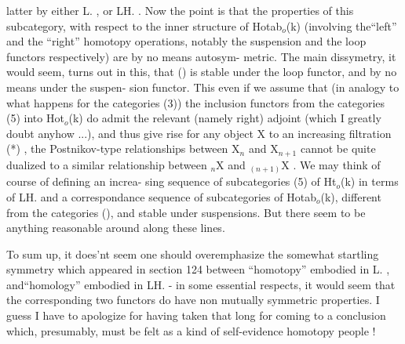
latter by either L\hand{$\pi$}. , or LH. . Now the point is that the properties
of this subcategory, with respect to the inner structure of Hotab$_o$(k)
(involving the``left'' and the ``right'' homotopy operations, notably the
suspension and the loop functors respectively) are by no means autosym-%
metric. The main dissymetry, it would seem, turns out in this, that
() is stable under the loop functor, and by no means under the suspen-%
sion functor. This  even if we assume that (in analogy
to what happens for the categories (3)) the inclusion functors from the
categories (5) into Hot$_o$(k) do admit the relevant (namely right) adjoint
(which I greatly doubt anyhow ...), and thus give rise for any object X
to an increasing filtration (*) , the Postnikov-type relationships
between X$_n$ and X$_{n+1}$ cannot be quite dualized to a similar relationship
between $_n$X and $_{(n+1)}$X . We may think  of course\hand{,} of defining an increa-%
sing sequence of subcategories  (5) of Ht$_o$(k) in terms of LH. and a
correspondance sequence of subcategories of Hotab$_o$(k), different from
the categories (), and stable under suspensions. 
 But there  seem to be anything reasonable 
around along these lines.

To sum up, it does'nt seem one should overemphasize the somewhat
startling symmetry which appeared in section 124 between ``homotopy''
 embodied in L\hand{$\pi$}. , and``homology'' embodied in LH. -
in some essential respects, it would seem that the corresponding two
functors do have non mutually symmetric properties. I guess I have to
apologize for having taken that long for coming to a conclusion which,
presumably, must be felt as a kind of self-evidence   homotopy
people ! \margin{$\lfloor$\\$\ulcorner$}

